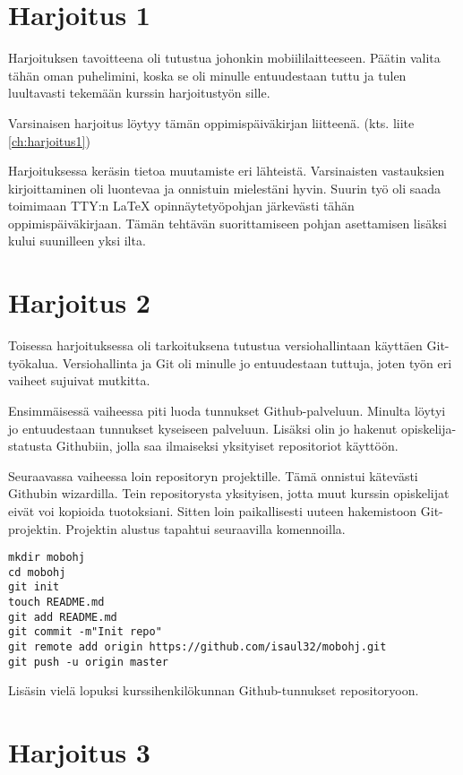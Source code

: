 \documentclass[globalnumbering,centeredcaptions,draftfooter]{tutthesis/tutthesis} %
\begin{document}
\section{Harjoitus 1}

Harjoituksen tavoitteena oli tutustua johonkin mobiililaitteeseen. Päätin valita tähän oman puhelimini, koska se oli minulle entuudestaan tuttu ja tulen luultavasti tekemään kurssin harjoitustyön sille.

Varsinaisen harjoitus löytyy tämän oppimispäiväkirjan liitteenä. (kts. liite \ref{ch:harjoitus1})

Harjoituksessa keräsin tietoa muutamiste eri lähteistä. Varsinaisten vastauksien kirjoittaminen oli luontevaa ja onnistuin mielestäni hyvin. Suurin työ oli saada toimimaan TTY:n LaTeX opinnäytetyöpohjan järkevästi tähän oppimispäiväkirjaan. Tämän tehtävän suorittamiseen pohjan asettamisen lisäksi kului suunilleen yksi ilta.

\section{Harjoitus 2}

Toisessa harjoituksessa oli tarkoituksena tutustua versiohallintaan käyttäen Git-työkalua. Versiohallinta ja Git oli minulle jo entuudestaan tuttuja, joten työn eri vaiheet sujuivat mutkitta.

Ensimmäisessä vaiheessa piti luoda tunnukset Github-palveluun. Minulta löytyi jo entuudestaan tunnukset kyseiseen palveluun. Lisäksi olin jo hakenut opiskelija-statusta Githubiin, jolla saa ilmaiseksi yksityiset repositoriot käyttöön.

Seuraavassa vaiheessa loin repositoryn projektille. Tämä onnistui kätevästi Githubin wizardilla. Tein repositorysta yksityisen, jotta muut kurssin opiskelijat eivät voi kopioida tuotoksiani. Sitten loin paikallisesti uuteen hakemistoon Git-projektin. Projektin alustus tapahtui seuraavilla komennoilla.

\begin{lstlisting}
mkdir mobohj
cd mobohj
git init
touch README.md
git add README.md
git commit -m"Init repo"
git remote add origin https://github.com/isaul32/mobohj.git
git push -u origin master
\end{lstlisting}

Lisäsin vielä lopuksi kurssihenkilökunnan Github-tunnukset repositoryoon.

\section{Harjoitus 3}
\end{document}
